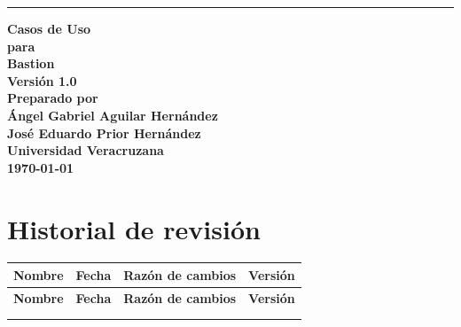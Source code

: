 \documentclass[11pt,letterpaper]{article}
\newcommand{\tituloDoc}{Casos de Uso}
\newcommand{\sistema}{Bastion}
\newcommand{\versionDoc}{Versión 1.0}
\newcommand{\fechaDoc}{\today}
\newcommand{\organizacion}{Universidad Veracruzana}
\begin{document}
\thispagestyle{empty}
\noindent\rule{\textwidth}{2pt}
\begin{flushright}
  {\Huge\bfseries\sffamily \tituloDoc}\\[2.5em]
  {\large\bfseries\sffamily para}\\[2.5em]
  {\Huge\bfseries\sffamily \sistema}\\[2.5em]
  {\large\bfseries\sffamily \versionDoc}\\[2.5em]
  {\large\bfseries\sffamily Preparado por}\\[2.5em]
  {\large\bfseries\sffamily Ángel Gabriel Aguilar Hernández}\\[1em]
  {\large\bfseries\sffamily José Eduardo Prior Hernández}\\[2.5em]
  {\large\bfseries\sffamily \organizacion}\\[2.5em]
  {\large\bfseries\sffamily \fechaDoc}
\end{flushright}
\newpage

\section*{Historial de revisión}

\noindent
\begin{longtable}{|L{0.22\textwidth}|L{0.14\textwidth}|L{0.39\textwidth}|L{0.14\textwidth}|}
\hline
\textbf{Nombre} & \textbf{Fecha} & \textbf{Razón de cambios} & \textbf{Versión} \\ \hline
\endfirsthead
\hline
\textbf{Nombre} & \textbf{Fecha} & \textbf{Razón de cambios} & \textbf{Versión} \\ \hline
\endhead
  &   &   &   \\ \hline
  &   &   &   \\ \hline
\end{longtable}
\newpage

\tableofcontents
\newpage


\newpage
\end{document}
